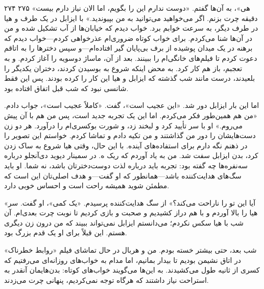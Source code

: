 ۲۷۴  
۲۷۵  
«هی»، به آن‌ها گفتم. «دوست ندارم این را بگویم، اما الان نیاز دارم بیست دقیقه چرت بزنم. اگر می‌خواهید می‌توانید به من بپیوندید.» با ایزابل در یک طرف و هیا در طرف دیگر، به سرعت خوابم برد. خواب دیدم که خیابان‌ها از آب تشکیل شده و من در آن‌ها شنا می‌کردم. برای خواب کوتاه ضروری‌ام عذرخواهی کردم—خواب دیدم که برهنه در یک میدان پوشیده از برف بی‌پایان گیر افتاده‌ام—و سپس دخترها را به اتاقم دعوت کردم تا فیلم‌های خانگی‌ام را ببینند. بعد از آن، ماساژ دوسویه را آغاز کردم. و به تعجبم، باز هم کار کرد. به محض اینکه شروع به بوسیدن کردند، دختران یکدیگر را بلعیدند، درست مانند شب گذشته که ایزابل و هیا این کار را کرده بودند. پس این فقط شانسی نبود که شب قبل اتفاق افتاده بود.

اما این بار ایزابل دور شد. «این عجیب است»، گفت.  
«کاملاً عجیب است»، جواب دادم. «من هم همین‌طور فکر می‌کردم. اما این یک تجربه جدید است، پس من هم با آن پیش می‌روم.»  
او با سر تأیید کرد و لبخند زد، و شورت بوکسری‌ام را درآورد. هر دو زن دست‌هایشان را دور من گذاشتند و من تکیه دادم و تماشا کردم. خواستم این تصویر را در ذهنم نگه دارم برای استفاده‌های آینده.  
با این حال، وقتی هیا شروع به ساک زدن کرد، بدن ایزابل سفت شد. من به یاد آوردم که ریک ه. در سمینار دیوید دی‌آنجلو درباره سه‌نفره‌ها چه گفته بود: تجربه باید درباره لذت دوست‌دخترتان باشد، نه شما. او باید سگ‌های هدایت‌کننده باشد—همانطور که او گفت—و هدف اصلی‌تان این است که مطمئن شوید همیشه راحت است و احساس خوبی دارد.  

«آیا این تو را ناراحت می‌کند؟» از سگ هدایت‌کننده پرسیدم.  
«یک کمی»، او گفت.  
سر هیا را بالا آوردم و با هم دراز کشیدیم و صحبت و بازی کردیم تا نوبت چرت بعدی‌ام. آن شب با هیا سکس نکردم؛ می‌دانستم ایزابل نمی‌تواند ببیند که من درون زن دیگری هستم. این قبلاً برای او یک قدم بزرگ بود.  

شب بعد، حتی بیشتر خسته بودم. من و هربال در حال تماشای فیلم «روابط خطرناک» در اتاق نشیمن بودیم تا بیدار بمانیم، اما مدام به خواب‌های روزانه‌ای می‌رفتیم که کسری از ثانیه طول می‌کشیدند. به این‌ها می‌گویند خواب‌های کوتاه: بدن‌هایمان آنقدر به استراحت نیاز داشتند که هرگاه توجه نمی‌کردیم، پنهانی چرت می‌زدند.  

